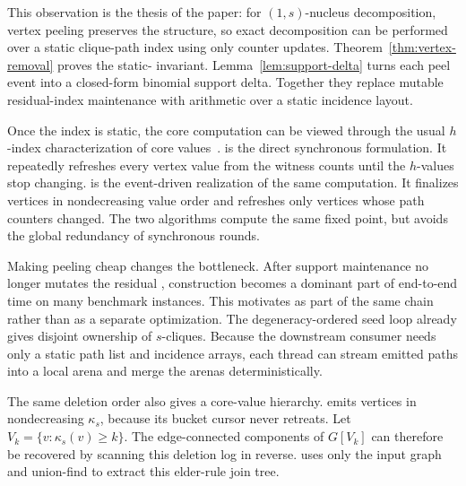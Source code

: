 This observation is the thesis of the paper:
for \((1,s)\)-nucleus decomposition, vertex peeling preserves the \cpi{} structure, so exact decomposition can be performed over a static clique-path index using only counter updates.
%
Theorem~\ref{thm:vertex-removal} proves the static-\cpi{} invariant.
%
Lemma~\ref{lem:support-delta} turns each peel event into a closed-form binomial support delta.
%
Together they replace mutable residual-index maintenance with arithmetic over a static incidence layout.

Once the index is static, the core computation can be viewed through the usual \(h\)-index characterization of core values~\cite{kcoreLocal,lu2016hcore,hindex}.
%
\localH{} is the direct synchronous formulation.
%
It repeatedly refreshes every vertex value from the \cpi{} witness counts until the \(h\)-values stop changing.
%
\peelH{} is the event-driven realization of the same computation.
%
It finalizes vertices in nondecreasing value order and refreshes only vertices whose path counters changed.
%
The two algorithms compute the same fixed point, but \peelH{} avoids the global redundancy of synchronous rounds.

Making peeling cheap changes the bottleneck.
%
After support maintenance no longer mutates the residual \cpi{}, construction becomes a dominant part of end-to-end time on many benchmark instances.
%
This motivates \paraBuild{} as part of the same chain rather than as a separate optimization.
%
The degeneracy-ordered seed loop already gives disjoint ownership of \(s\)-cliques.
%
Because the downstream consumer needs only a static path list and incidence arrays, each thread can stream emitted paths into a local arena and merge the arenas deterministically.

The same deletion order also gives a core-value hierarchy.
%
\peelH{} emits vertices in nondecreasing \(\kappa_s\), because its bucket cursor never retreats.
%
Let \(V_k=\{v:\kappa_s(v)\ge k\}\).
%
The edge-connected components of \(G[V_k]\) can therefore be recovered by scanning this deletion log in reverse.
%
\buildHier{} uses only the input graph and union-find to extract this elder-rule join tree.

